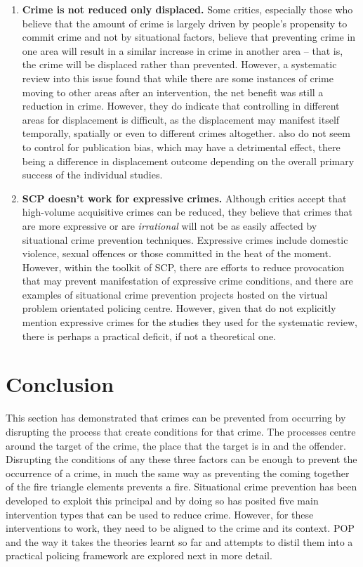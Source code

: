 \begin{enumerate}

 \item{\bf{Crime is not reduced only displaced.} }Some critics, especially those who believe that the amount of crime is largely driven by people’s propensity to commit crime and not by situational factors, believe that preventing crime in one area will result in a similar increase in crime in another area – that is, the crime will be displaced rather than prevented. However, a systematic review into this issue \parencite{guerette2009assessing} found that while there are some instances of crime moving to other areas after an intervention, the net benefit was still a reduction in crime. However, they do indicate that controlling in different areas for displacement is difficult, as the displacement may manifest itself temporally, spatially or even to different crimes altogether.\textcite{guerette2009assessing} also do not seem to control for publication bias, which may have a detrimental effect, there being a difference in displacement outcome depending on the overall primary success of the individual studies.
 
 \item{\bf{SCP doesn't work for expressive crimes.}} Although critics accept that high-volume acquisitive crimes can be reduced, they believe that crimes that are more expressive or are \emph{irrational} will not be as easily affected by situational crime prevention techniques. Expressive crimes include domestic violence, sexual offences or those committed in the heat of the moment. However, within the toolkit of SCP, there are efforts to reduce provocation that may prevent manifestation of expressive crime conditions, and there are examples of situational crime prevention projects hosted on the virtual problem orientated policing centre. However, given that \parencite{guerette2009assessing} do not explicitly mention expressive crimes for the studies they used for the systematic review, there is perhaps a practical deficit, if not a theoretical one.
 
 \end{enumerate}


\section{Conclusion} This section has demonstrated that crimes can be prevented from occurring by disrupting the process that create conditions for that crime. The processes centre around the target of the crime, the place that the target is in and the offender. Disrupting the conditions of any these three factors can be enough to prevent the occurrence of a crime, in much the same way as preventing the coming together of the fire triangle elements prevents a fire. Situational crime prevention has been developed to exploit this principal and by doing so has posited five main intervention types that can be used to reduce crime. However, for these interventions to work, they need to be aligned to the crime and its context. POP and the way it takes the theories learnt so far and attempts to distil them into a practical policing framework are explored next in more detail.


